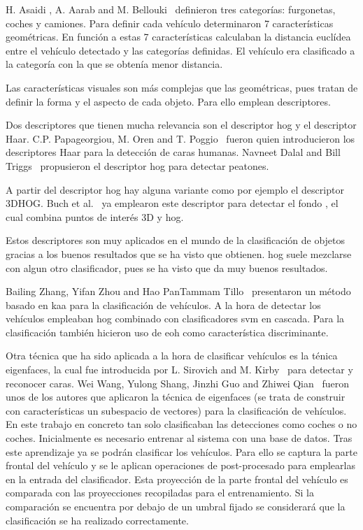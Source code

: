 H. Asaidi , A. Aarab and M. Bellouki~\cite{shadow_elimination} definieron tres categorías: furgonetas, coches y camiones. Para definir cada vehículo determinaron 7 características geométricas. En función a estas 7 características calculaban la distancia euclídea entre el vehículo detectado y las categorías definidas. El vehículo era clasificado a la categoría con la que se obtenía menor distancia.

Las características visuales son más complejas que las geométricas, pues tratan de definir la forma y el aspecto de cada objeto. Para ello emplean descriptores.

Dos descriptores que tienen mucha relevancia son el descriptor \acrfull{hog} y el descriptor Haar. C.P. Papageorgiou, M. Oren and T. Poggio~\cite{haar_paper} fueron quien introducieron los descriptores Haar para la detección de caras humanas. Navneet Dalal and Bill Triggs~\cite{hog_paper} propusieron el descriptor \acrshort{hog} para detectar peatones.

A partir del descriptor \acrshort{hog} hay alguna variante como por ejemplo el descriptor 3DHOG. Buch et al.~\cite{3dhog_article} ya emplearon este descriptor para detectar el fondo , el cual combina puntos de interés 3D y \acrshort{hog}.

Estos descriptores son muy aplicados en el mundo de la clasificación de objetos gracias a los buenos resultados que se ha visto que obtienen. \acrshort{hog} suele mezclarse con algun otro clasificador, pues se ha visto que da muy buenos resultados.

Bailing Zhang, Yifan Zhou and Hao PanTammam Tillo~\cite{hybrid_model} presentaron un método basado en \acrfull{kaa} para la clasificación de vehículos. A la hora de detectar los vehículos empleaban \acrshort{hog} combinado con clasificadores \acrfull{svm} en cascada. Para la clasificación también hicieron uso de \acrfull{eoh} como característica discriminante.

Otra técnica que ha sido aplicada a la hora de clasificar vehículos es la ténica eigenfaces, la cual fue introducida por L. Sirovich and M. Kirby~\cite{low_dimensional} para detectar y reconocer caras. Wei Wang, Yulong Shang, Jinzhi Guo and Zhiwei Qian~\cite{real_time_vehicle} fueron unos de los autores que aplicaron la técnica de eigenfaces (se trata de construir con características un subespacio de vectores) para la clasificación de vehículos. En este trabajo en concreto tan solo clasificaban las detecciones como coches o no coches. Inicialmente es necesario entrenar al sistema con una base de datos. Tras este aprendizaje ya se podrán clasificar los vehículos. Para ello se captura la parte frontal del vehículo y se le aplican operaciones de post-procesado para emplearlas en la entrada del clasificador. Esta proyección de la parte frontal del vehículo es comparada con las proyecciones recopiladas para el entrenamiento. Si la comparación se encuentra por debajo de un umbral fijado se considerará que la clasificación se ha realizado correctamente. 

